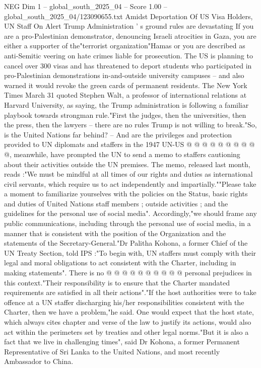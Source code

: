 \begin{textsample}{NEG Dim 1 – global\_south\_2025\_04 – Score 1.00 – global\_south\_2025\_04/123090655.txt}  \label{ex:f1_neg_129}
Amidst Deportation Of US Visa Holders, UN Staff On Alert Trump Administration ' s ground rules are devastating If you are a pro-Palestinian demonstrator, denouncing Israeli atrocities in Gaza, you are either a supporter of the"terrorist organization"Hamas or you are described as anti-Semitic veering on hate crimes liable for prosecution.
The US is planning to cancel over 300 visas and has threatened to deport students who participated in pro-Palestinian demonstrations in-and-outside university campuses -- and also warned it would revoke the green cards of permanent residents.
The New York Times March 31 quoted Stephen Walt, a professor of international relations at Harvard University, as saying, the Trump administration is following a familiar playbook towards strongman rule."First the judges, then the universities, then the press, then the lawyers -- there are no rules Trump is not willing to break."So, is the United Nations far behind? -- And are the privileges and protection provided to UN diplomats and staffers in the 1947 UN-US @ @ @ @ @ @ @ @ @ @, meanwhile, have prompted the UN to send a memo to staffers cautioning about their activities outside the UN premises.
The memo, released last month, reads :"We must be mindful at all times of our rights and duties as international civil servants, which require us to act independently and impartially.""Please take a moment to familiarize yourselves with the policies on the Status, basic rights and duties of United Nations staff members ; outside activities ; and the guidelines for the personal use of social media".
Accordingly,"we should frame any public communications, including through the personal use of social media, in a manner that is consistent with the position of the Organization and the statements of the Secretary-General."Dr Palitha Kohona, a former Chief of the UN Treaty Section, told IPS :"To begin with, UN staffers must comply with their legal and moral obligations to act consistent with the Charter, including in making statements".
There is no @ @ @ @ @ @ @ @ @ @ personal prejudices in this context."Their responsibility is to ensure that the Charter mandated requirements are satisfied in all their actions"."If the host authorities were to take offence at a UN staffer discharging his/her responsibilities consistent with the Charter, then we have a problem,"he said.
One would expect that the host state, which always cites chapter and verse of the law to justify its actions, would also act within the perimeters set by treaties and other legal norms."But it is also a fact that we live in challenging times", said Dr Kohona, a former Permanent Representative of Sri Lanka to the United Nations, and most recently Ambassador to China.

\end{textsample}
